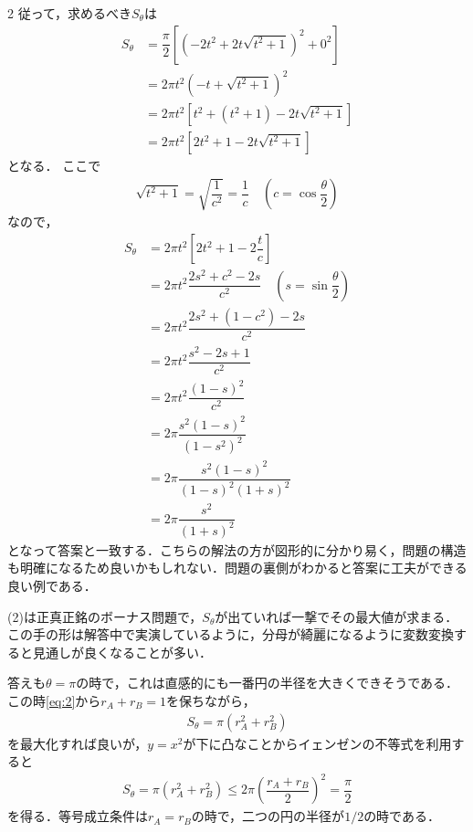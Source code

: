 \documentclass[../../main.tex]{subfiles}
\begin{document}
\begin{multicols}{2}
  従って，求めるべき$S_{\theta}$は
  \begin{align}
    S_{\theta}
    & = \dfrac{\pi}{2}\left[\left(-2t^2+2t\sqrt{t^2+1}\right)^2 + 0^2 \right] \\
    & = 2\pi t^2 \left(-t+\sqrt{t^2+1}\right)^2 \\
    & =2\pi t^2 \left[t^2 + (t^2+1) -2t\sqrt{t^2+1} \right]  \\
    & =2\pi t^2 \left[2t^2 + 1 - 2t\sqrt{t^2+1} \right]
  \end{align}
  となる．
  ここで
  \begin{align}
    \sqrt{t^2+1} = \sqrt{\dfrac{1}{c^2}} = \dfrac{1}{c} \quad \left(c=\cos\dfrac{\theta}{2}\right)
  \end{align}
  なので，
  \begin{align}
    S_{\theta}
    &= 2\pi t^2 \left[2t^2 + 1 -2\dfrac{t}{c} \right] \\
    &= 2\pi t^2 \dfrac{2s^2 + c^2 -2s}{c^2} \quad \left(s=\sin\dfrac{\theta}{2}\right) \\
    &=2\pi t^2 \dfrac{2s^2 + (1-c^2) -2s}{c^2} \\
    &=2\pi t^2 \dfrac{s^2 -2s + 1}{c^2} \\
    &=2\pi t^2 \dfrac{(1-s)^2}{c^2} \\
    &=2\pi \dfrac{s^2(1-s)^2}{(1-s^2)^2} \\
    &=2\pi \dfrac{s^2(1-s)^2}{(1-s)^2(1+s)^2} \\
    &=2\pi \dfrac{s^2}{(1+s)^2}
  \end{align}
  となって答案と一致する．こちらの解法の方が図形的に分かり易く，問題の構造も明確になるため良いかもしれない．問題の裏側がわかると答案に工夫ができる良い例である．

  (2)は正真正銘のボーナス問題で，$S_{\theta}$が出ていれば一撃でその最大値が求まる．
  この手の形は解答中で実演しているように，分母が綺麗になるように変数変換すると見通しが良くなることが多い．

  答えも$\theta=\pi$の時で，これは直感的にも一番円の半径を大きくできそうである．
  この時\cref{eq:2}から$r_A+r_B=1$を保ちながら，
  \begin{align}
    S_{\theta} = \pi\left(r_A^2+r_B^2\right)
  \end{align}
  を最大化すれば良いが，$y=x^2$が下に凸なことからイェンゼンの不等式を利用すると
  \begin{align}
    S_{\theta} = \pi\left(r_A^2+r_B^2\right) \le 2\pi \left(\dfrac{r_A+r_B}{2}\right)^2 = \dfrac{\pi}{2}
  \end{align}
  を得る．等号成立条件は$r_A=r_B$の時で，二つの円の半径が$1/2$の時である．

  \newpage
\end{multicols}
\end{document}
